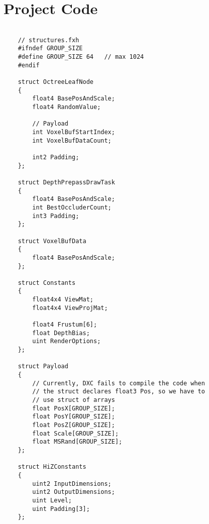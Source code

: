 \section*{Project Code}


\begin{lstlisting}

    // structures.fxh
    #ifndef GROUP_SIZE
    #define GROUP_SIZE 64   // max 1024
    #endif
    
    struct OctreeLeafNode
    {
        float4 BasePosAndScale;
        float4 RandomValue;
        
        // Payload
        int VoxelBufStartIndex;
        int VoxelBufDataCount;
        
        int2 Padding;
    };
    
    struct DepthPrepassDrawTask
    {
        float4 BasePosAndScale;
        int BestOccluderCount;
        int3 Padding;
    };
    
    struct VoxelBufData
    {
        float4 BasePosAndScale;
    };
    
    struct Constants
    {
        float4x4 ViewMat;
        float4x4 ViewProjMat;
        
        float4 Frustum[6];
        float DepthBias;
        uint RenderOptions;
    };
    
    struct Payload
    {
        // Currently, DXC fails to compile the code when
        // the struct declares float3 Pos, so we have to
        // use struct of arrays
        float PosX[GROUP_SIZE];
        float PosY[GROUP_SIZE];
        float PosZ[GROUP_SIZE];
        float Scale[GROUP_SIZE];
        float MSRand[GROUP_SIZE];
    };
    
    struct HiZConstants
    {
        uint2 InputDimensions;
        uint2 OutputDimensions;
        uint Level;
        uint Padding[3];
    };

\end{lstlisting}


